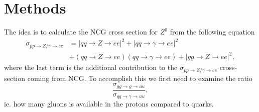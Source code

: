 \section{Methods}
The idea is to calculate the NCG cross section for $Z^0$ from the following equation
\begin{align}
	\sigma_{pp \rightarrow Z / \gamma \rightarrow ee} &= |qq \rightarrow Z \rightarrow ee|^2 + |qq \rightarrow \gamma \rightarrow ee|^2 \nonumber \\
	&+ (qq \rightarrow Z \rightarrow ee)(qq \rightarrow \gamma \rightarrow ee) + |gg \rightarrow Z \rightarrow ee|^2,
\end{align}
where the last term is the additional contribution to the $\sigma_{pp \rightarrow Z / \gamma \rightarrow ee}$ cross-section coming from NCG. To accomplish this we first need to examine the ratio
\begin{equation}
	\frac{\sigma_{gg \rightarrow g \rightarrow uu}}{\sigma_{qq \rightarrow \gamma \rightarrow uu}},
\end{equation}
ie. how many gluons is available in the protons compared to quarks.